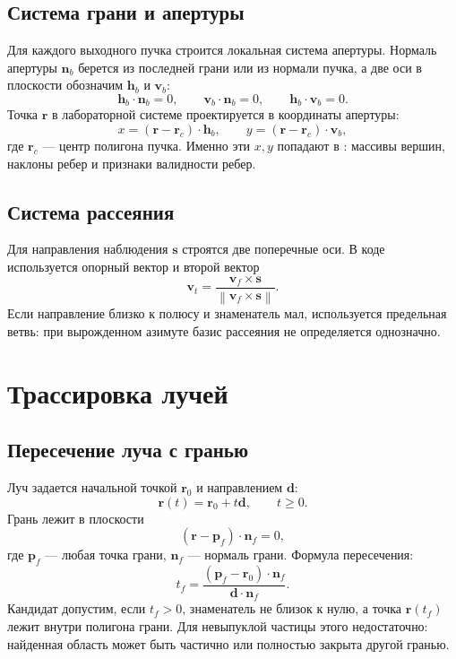 \documentclass[11pt,a4paper]{article}
\newcommand{\code}[1]{\texttt{\small\detokenize{#1}}}
\newcommand{\vect}[1]{\symbf{#1}}
\newcommand{\norm}[1]{\left\lVert #1 \right\rVert}
\begin{document}
\subsection{Система грани и апертуры}

Для каждого выходного пучка строится локальная система апертуры. Нормаль апертуры $\vect n_b$ берется из последней грани или из нормали пучка, а две оси в плоскости обозначим $\vect h_b$ и $\vect v_b$:
\[
  \vect h_b\cdot\vect n_b=0,\qquad
  \vect v_b\cdot\vect n_b=0,\qquad
  \vect h_b\cdot\vect v_b=0.
\]
Точка $\vect r$ в лабораторной системе проектируется в координаты апертуры:
\[
  x = (\vect r-\vect r_c)\cdot\vect h_b,\qquad
  y = (\vect r-\vect r_c)\cdot\vect v_b,
\]
где $\vect r_c$ --- центр полигона пучка. Именно эти $x,y$ попадают в \code{BeamEdgeData}: массивы вершин, наклоны ребер и признаки валидности ребер.

\subsection{Система рассеяния}

Для направления наблюдения $\vect s$ строятся две поперечные оси. В коде используется опорный вектор \code{vf} и второй вектор
\[
  \vect v_t =
  \frac{\vect v_f\times\vect s}
       {\norm{\vect v_f\times\vect s}}.
\]
Если направление близко к полюсу и знаменатель мал, используется предельная
ветвь: при вырожденном азимуте базис рассеяния не определяется однозначно.

\section{Трассировка лучей}

\subsection{Пересечение луча с гранью}

Луч задается начальной точкой $\vect r_0$ и направлением $\vect d$:
\[
  \vect r(t)=\vect r_0+t\vect d,\qquad t\ge0.
\]
Грань лежит в плоскости
\[
  (\vect r-\vect p_f)\cdot\vect n_f=0,
\]
где $\vect p_f$ --- любая точка грани, $\vect n_f$ --- нормаль грани. Формула пересечения:
\[
  t_f =
  \frac{(\vect p_f-\vect r_0)\cdot\vect n_f}
       {\vect d\cdot\vect n_f}.
\]
Кандидат допустим, если $t_f>0$, знаменатель не близок к нулю, а точка
$\vect r(t_f)$ лежит внутри полигона грани. Для невыпуклой частицы этого
недостаточно: найденная область может быть частично или полностью закрыта
другой гранью.
\end{document}
